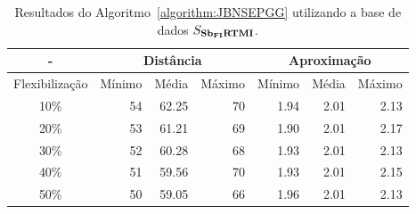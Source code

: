 \begin{table}[!htb]
  \caption{Resultados do Algoritmo~\ref{algorithm:JBNSEPGG} utilizando a base de dados $S_{\textbf{Sb\textsubscript{FI}RTMI}}{}$.}
  \label{table:XHZJQXXJ}
  \centering
  \begin{tabular}{|c|r|r|r|r|r|r|}
    \hline
      -            & \multicolumn{3}{c|}{Distância}             & \multicolumn{3}{c|}{Aproximação}           \\ \hline
    Flexibilização & Mínimo       & Média        & Máximo       & Mínimo       & Média        & Máximo       \\ \hline  
    10\%           & 54           & 62.25        & 70           & 1.94         & 2.01         & 2.13         \\ \hline
    20\%           & 53           & 61.21        & 69           & 1.90         & 2.01         & 2.17         \\ \hline
    30\%           & 52           & 60.28        & 68           & 1.93         & 2.01         & 2.13         \\ \hline
    40\%           & 51           & 59.56        & 70           & 1.93         & 2.01         & 2.15         \\ \hline
    50\%           & 50           & 59.05        & 66           & 1.96         & 2.01         & 2.13         \\ \hline    
  \end{tabular}
\end{table}